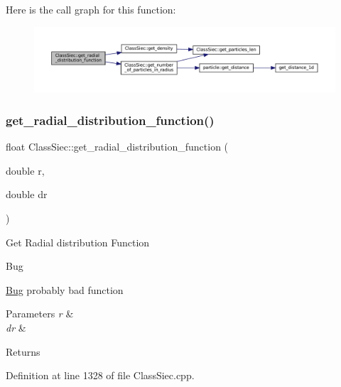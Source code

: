 Here is the call graph for this function\+:
\nopagebreak
\begin{figure}[H]
\begin{center}
\leavevmode
\includegraphics[width=350pt]{classClassSiec_a1a3c05e29d9fb646f1733704db81933d_cgraph}
\end{center}
\end{figure}
\mbox{\label{classClassSiec_a95685407da49bfa4d1a54fd248e8aee3}} 
\subsubsection{\texorpdfstring{get\+\_\+radial\+\_\+distribution\+\_\+function()}{get\_radial\_distribution\_function()}\hspace{0.1cm}{\footnotesize\ttfamily [2/2]}}
{\footnotesize\ttfamily float Class\+Siec\+::get\+\_\+radial\+\_\+distribution\+\_\+function (\begin{DoxyParamCaption}\item[{double}]{r,  }\item[{double}]{dr }\end{DoxyParamCaption})}

Get Radial distribution Function \begin{DoxyRefDesc}{Bug}
\item[\mbox{\hyperlink{bug__bug000003}{Bug}}]probably bad function \end{DoxyRefDesc}

\begin{DoxyParams}{Parameters}
{\em r} & \\
\hline
{\em dr} & \\
\hline
\end{DoxyParams}
\begin{DoxyReturn}{Returns}

\end{DoxyReturn}


Definition at line 1328 of file Class\+Siec.\+cpp.



